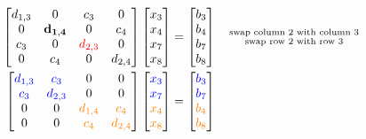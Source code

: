 \documentclass{article}
\begin{document}
\begin{align*}
     \begin{bmatrix}
         d_{1,3} & 0  & c_{3} & 0\\
        0 & \mathbf{d_{1,4}} & 0 & c_{4} \\
        c_{3} & 0 & \color{red}d_{2,3}\color{black} & 0 \\
        0 &c_{4} &  0 & d_{2,4}
    \end{bmatrix}\begin{bmatrix}
         x_{3} \\ x_{4} \\ x_{7} \\ x_{8}
    \end{bmatrix} = \begin{bmatrix}
        b_{3} \\ b_{4}  \\ b_{7} \\ b_{8}
    \end{bmatrix}  \quad \substack{\text{swap column $2$ with column $3$} \\
                                  \text{swap row $2$ with row $3$}} \\
                                  \begin{bmatrix}
         \color{blue}d_{1,3}\color{black} & \color{blue}c_{3}\color{black}  & 0 & 0\\
         \color{blue}c_{3}\color{black} & \color{blue}d_{2,3}\color{black} & 0 & 0 \\
        0 & 0 & \color{orange}d_{1,4}\color{black} & \color{orange}c_{4}\color{black} \\
        0 &0&  \color{orange}c_{4}\color{black} & \color{orange}d_{2,4}\color{black}
    \end{bmatrix}\begin{bmatrix}
         \color{blue}x_{3}\color{black} \\ \color{blue}x_{7}\color{black} \\ \color{orange}x_{4}\color{black} \\ \color{orange}x_{8}\color{black}
    \end{bmatrix} = \begin{bmatrix}
        \color{blue}b_{3}\color{black} \\ \color{blue}b_{7}\color{black}  \\ \color{orange}b_{4}\color{black} \\ \color{orange}b_{8}\color{black}
    \end{bmatrix}  \quad \phantom{\substack{\text{swap column $2$ with column $3$} \\
                                  \text{swap row $2$ with row $3$}}}
\end{align*}
\end{document}
